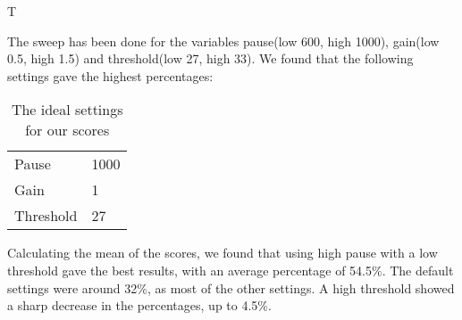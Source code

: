 T%

The sweep has been done for the variables pause(low 600, high 1000), gain(low 0.5, high 1.5) and threshold(low 27, high 33). We found that the following settings gave the highest percentages:

\begin{table}[]
\centering
\caption{The ideal settings for our scores}
\label{my-label}
\begin{tabular}{l|l}
Pause     & 1000 \\
Gain      & 1    \\
Threshold & 27  
\end{tabular}
\end{table}

Calculating the mean of the scores, we found that using high pause with a low threshold gave the best results, with an average percentage of 54.5$\%$. The default settings were around 32$\%$, as most of the other settings. A high threshold showed a sharp decrease in the percentages, up to 4.5$\%$.

